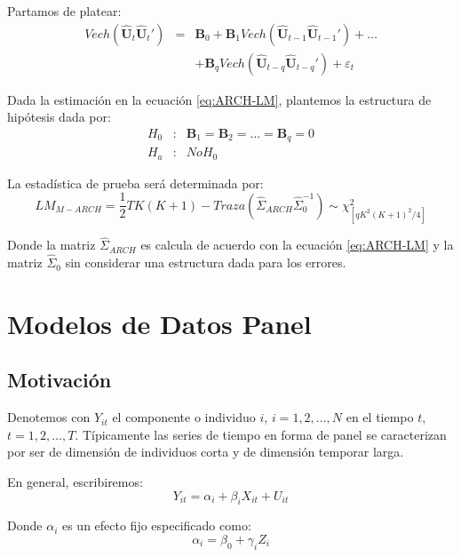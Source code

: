 \documentclass[
]{book}
\begin{document}
Partamos de platear:
\begin{eqnarray}
    Vech(\hat{\mathbf{U}}_t \hat{\mathbf{U}}_t') & = & \mathbf{B}_0 + \mathbf{B}_1 Vech(\hat{\mathbf{U}}_{t-1} \hat{\mathbf{U}}_{t-1}') + \ldots \\ \nonumber
    & & + \mathbf{B}_q Vech(\hat{\mathbf{U}}_{t-q} \hat{\mathbf{U}}_{t-q}') + \varepsilon_t
    \label{eq:ARCH-LM}
\end{eqnarray}

Dada la estimación en la ecuación \eqref{eq:ARCH-LM}, plantemos la estructura de hipótesis dada por:
\begin{eqnarray*}
    H_0 & : & \mathbf{B}_1 = \mathbf{B}_2 = \ldots = \mathbf{B}_q = 0 \\
    H_a & : & No H_0    
\end{eqnarray*}

La estadística de prueba será determinada por:
\begin{equation}
    LM_{M-ARCH} = \frac{1}{2} T K (K + 1) - Traza \left( \hat{\Sigma}_{ARCH} \hat{\Sigma}^{-1}_{0} \right) \sim \chi^2_{[q K^2 (K + 1)^2 / 4]}
\end{equation}

Donde la matriz \(\hat{\Sigma}_{ARCH}\) es calcula de acuerdo con la ecuación \eqref{eq:ARCH-LM} y la matriz \(\hat{\Sigma}_{0}\) sin considerar una estructura dada para los errores.

\hypertarget{modelos-de-datos-panel}{%
\chapter{Modelos de Datos Panel}\label{modelos-de-datos-panel}}

\hypertarget{motivaciuxf3n-2}{%
\section{Motivación}\label{motivaciuxf3n-2}}

Denotemos con \(Y_{it}\) el componente o individuo \(i\), \(i = 1, 2, \ldots, N\) en el tiempo \(t\), \(t = 1, 2, \ldots, T\). Típicamente las series de tiempo en forma de panel se caracterizan por ser de dimensión de individuos corta y de dimensión temporar larga.

En general, escribiremos:
\begin{equation}
    Y_{it} = \alpha_i + \beta_i X_{it} + U_{it}
\end{equation}

Donde \(\alpha_i\) es un efecto fijo especificado como:
\begin{equation}
    \alpha_i = \beta_0 + \gamma_i Z_i
\end{equation}
\end{document}

